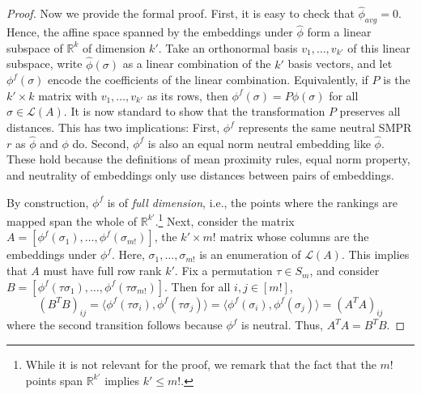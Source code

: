 \documentclass[prodmode,acmec]{ec-acmsmall}
\newcommand{\calL}{{\mathcal{L}}}
\newcommand{\rank}{{\calL(A)}}
\begin{document}
\begin{proof}
Now we provide the formal proof. First, it is easy to check that $\hat{\phi}_{avg} = 0$. Hence, the affine space spanned by the embeddings under $\hat{\phi}$ form a linear subspace of $\mathbb{R}^k$ of dimension $k'$. Take an orthonormal basis $v_1,\ldots,v_{k'}$ of this linear subspace, write $\hat{\phi}(\sigma)$ as a linear combination of the $k'$ basis vectors, and let $\phi^f(\sigma)$ encode the coefficients of the linear combination. Equivalently, if $P$ is the $k' \times k$ matrix with $v_1,\ldots,v_{k'}$ as its rows, then $\phi^f(\sigma) = P \phi(\sigma)$ for all $\sigma \in \rank$. It is now standard to show that the transformation $P$ preserves all distances. This has two implications: First, $\phi^f$ represents the same neutral SMPR $r$ as $\hat{\phi}$ and $\phi$ do. Second, $\phi^f$ is also an equal norm neutral embedding like $\hat{\phi}$. These hold because the definitions of mean proximity rules, equal norm property, and neutrality of embeddings only use distances between pairs of embeddings. 

By construction, $\phi^f$ is of \emph{full dimension}, i.e., the points where the rankings are mapped span the whole of $\mathbb{R}^{k'}$.\footnote{While it is not relevant for the proof, we remark that the fact that the $m!$ points span $\mathbb{R}^{k'}$ implies $k' \le m!$.} Next, consider the matrix $A = [\phi^f(\sigma_1), \ldots, \phi^f(\sigma_{m!})]$, the $k' \times m!$ matrix whose columns are the embeddings under $\phi^f$. Here, $\sigma_1,\ldots,\sigma_{m!}$ is an enumeration of $\rank$. This implies that $A$ must have full row rank $k'$. Fix a permutation $\tau \in S_m$, and consider $B = [\phi^f(\tau \sigma_1), \ldots, \phi^f(\tau \sigma_{m!})]$. Then for all $i,j \in [m!]$, 
$$
(B^T B)_{ij} = \langle \phi^f(\tau \sigma_i), \phi^f(\tau \sigma_j) \rangle = \langle \phi^f(\sigma_i), \phi^f(\sigma_j) \rangle = (A^T A)_{ij}
$$
where the second transition follows because $\phi^f$ is neutral. Thus, $A^T A = B^T B$.


\end{proof}
\end{document}
